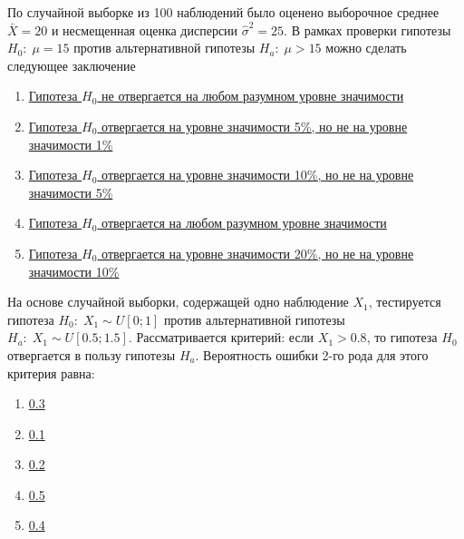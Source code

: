 \documentclass[t]{beamer}
\begin{document}
 \begin{frame} \label{43} 
\begin{block}{43} 

По случайной выборке из 100 наблюдений было оценено выборочное среднее $\bar{X}=20$  и несмещенная оценка дисперсии  $\hat{\sigma}^2=25$. В рамках проверки гипотезы $H_0: \; \mu=15$  против альтернативной гипотезы $H_a: \; \mu>15$  можно сделать следующее заключение
 


 \end{block} 
\begin{enumerate} 
\item[] \hyperlink{43-No}{\beamergotobutton{} Гипотеза $H_0$  не отвергается на любом разумном уровне значимости}
\item[] \hyperlink{43-No}{\beamergotobutton{} Гипотеза $H_0$  отвергается на уровне значимости 5\%, но не  на уровне значимости 1\%}
\item[] \hyperlink{43-No}{\beamergotobutton{} Гипотеза  $H_0$ отвергается на уровне значимости 10\%, но не на уровне значимости 5\%}
\item[] \hyperlink{43-Yes}{\beamergotobutton{} Гипотеза $H_0$  отвергается на любом разумном уровне значимости}
\item[] \hyperlink{43-No}{\beamergotobutton{} Гипотеза  $H_0$ отвергается на уровне значимости 20\%, но не  на уровне значимости 10\%}
\end{enumerate} 
\end{frame} 


 \begin{frame} \label{44} 
\begin{block}{44} 

На основе случайной выборки, содержащей одно наблюдение  $X_1$, тестируется гипотеза $H_0: \; X_1 \sim U[0;1]$  против альтернативной гипотезы  $H_a: \; X_1 \sim U[0.5;1.5]$. Рассматривается критерий: если $X_1>0.8$, то гипотеза $H_0$  отвергается в пользу гипотезы  $H_a$. Вероятность ошибки 2-го рода для этого критерия равна:
 


 \end{block} 
\begin{enumerate} 
\item[] \hyperlink{44-Yes}{\beamergotobutton{} 0.3}
\item[] \hyperlink{44-No}{\beamergotobutton{} 0.1}
\item[] \hyperlink{44-No}{\beamergotobutton{} 0.2}
\item[] \hyperlink{44-No}{\beamergotobutton{} 0.5}
\item[] \hyperlink{44-No}{\beamergotobutton{} 0.4}
\end{enumerate} 
\end{frame} 
\end{document}

